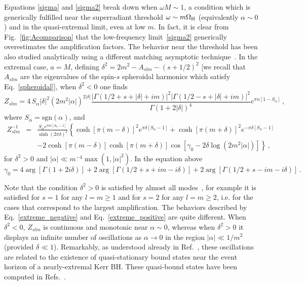 \documentclass[11pt]{article}
\newcommand{\nn}{\nonumber}
\numberwithin{equation}{section} %
\begin{document}
Equations \eqref{sigma} and \eqref{sigma2} break down when $\omega M\sim1$, a condition which is generically fulfilled near the superradiant threshold $\omega\sim m\Omega_{\rm H}$ (equivalently $\alpha\sim0$) and in the quasi-extremal limit, even at low $m$. In fact, it is clear from Fig.~\ref{fig:Acomparison} that the low-frequency limit~\eqref{sigma2} generically overestimates the amplification factors. 
The behavior near the threshold has been also studied analytically using a different matching asymptotic technique~\cite{Starobinski:1973}. 
In the extremal case, $a=M$, defining $\delta^2=2m^2-A_{slm}-(s+1/2)^2$ [we recall that $A_{slm}$ are the eigenvalues of the spin-$s$ spheroidal harmonics which satisfy Eq.~\eqref{spheroidal}], when $\delta^2<0$ one finds~\cite{Starobinski2:1973}
%
\begin{equation}
Z_{slm}=4\,{S_\alpha} |\delta|^2 \left(2m^2|\alpha|\right)^{2|\delta|}\frac{|\Gamma(1/2+s+|\delta|+im)|^2|\Gamma(1/2-s+|\delta|+im)|^2}{\Gamma(1+2|\delta|)^4} e^{\pi n[1-{S_\alpha}]}\,, \label{extreme_negative}
\end{equation}
%
where $S_\alpha=\text{sgn}(\alpha)$, and
%
\begin{eqnarray}
 Z_{slm}^{-1}&=& \frac{{S_\alpha}e^{\pi m[{S_\alpha}-1]}}{\sinh(2\pi\delta)^2}\left\{\cosh[\pi(m-\delta)]^2 e^{\pi\delta[{S_\alpha}-1]}+
 \cosh[\pi(m+\delta)]^2 e^{-\pi\delta[{S_\alpha}-1]}\right.\nn\\
 &&\left.-2\cosh[\pi(m-\delta)]\cosh[\pi(m+\delta)] \cos[\gamma_0-2\delta\log(2m^2|\alpha|)]\right\}   \,, \label{extreme_positive}
\end{eqnarray}
%
for $\delta^2>0$ and $|\alpha|\ll m^{-4}\max(1,|\alpha|^2)$. In the equation above
\begin{equation}
 \gamma_0=4\arg[\Gamma(1+2i\delta)]+2\arg[\Gamma(1/2+s+im-i\delta)]+2\arg[\Gamma(1/2+s-im-i\delta)]\,.
\end{equation}

Note that the condition $\delta^2>0$ is satisfied by almost all modes~\cite{Cardoso:2004hh}, for example it is satisfied for $s=1$ for any $l=m\geq1$ and for $s=2$ for any $l=m\geq2$, i.e. for the cases that correspond to the largest amplification.
The behaviors described by Eq.~\eqref{extreme_negative} and Eq.~\eqref{extreme_positive} are quite different. When $\delta^2<0$, $Z_{slm}$ is continuous and monotonic near $\alpha\sim 0$, whereas when $\delta^2>0$ it displays an infinite number of oscillations as $\alpha\to 0$ in the region $|\alpha|\ll1/m^2$ (provided $\delta\ll1$). Remarkably, as understood already in Ref.~\cite{Starobinski:1973}, these oscillations are related to the existence of quasi-stationary bound states near the event horizon of a nearly-extremal Kerr BH. These quasi-bound states have been computed in Refs.~\cite{Detweiler:1980gk,Andersson:1999wj,Yang:2012pj}. 
\end{document}
